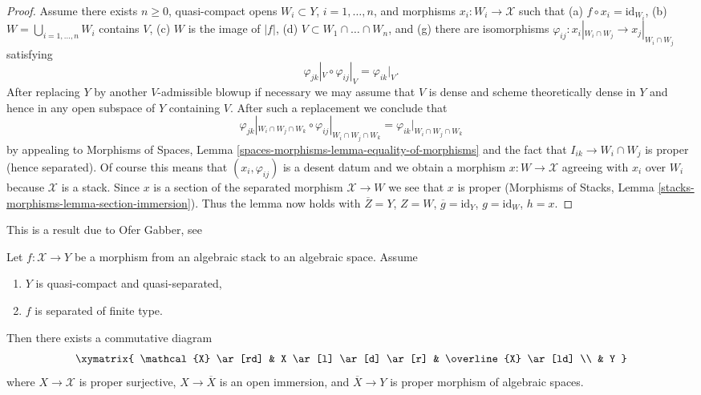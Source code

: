 \begin{proof}
\medskip\noindent
Assume there exists $n \geq 0$, quasi-compact opens
$W_i \subset Y$, $i = 1, \ldots, n$, and
morphisms $x_i : W_i \to \mathcal{X}$ such that
(a) $f \circ x_i = \text{id}_{W_i}$,
(b) $W = \bigcup_{i = 1, \ldots, n} W_i$ contains $V$,
(c) $W$ is the image of $|f|$,
(d) $V \subset W_1 \cap \ldots \cap W_n$, and
(g) there are isomorphisms
$\varphi_{ij} : x_i|_{W_i \cap W_j} \to x_j|_{W_i \cap W_j}$
satisfying
$$
\varphi_{jk}|_V \circ \varphi_{ij}|_V = \varphi_{ik}|_V.
$$
After replacing $Y$ by another $V$-admissible blowup if necessary
we may assume that $V$ is dense and scheme theoretically dense
in $Y$ and hence in any open subspace of $Y$ containing $V$.
After such a replacement we conclude that
$$
\varphi_{jk}|_{W_i \cap W_j \cap W_k} \circ
\varphi_{ij}|_{W_i \cap W_j \cap W_k} =
\varphi_{ik}|_{W_i \cap W_j \cap W_k}
$$
by appealing to Morphisms of Spaces, Lemma
\ref{spaces-morphisms-lemma-equality-of-morphisms}
and the fact that $I_{ik} \to W_i \cap W_j$ is proper
(hence separated).
Of course this means that $(x_i, \varphi_{ij})$
is a desent datum and we obtain a morphism
$x : W \to \mathcal{X}$ agreeing with $x_i$ over $W_i$
because $\mathcal{X}$ is a stack.
Since $x$ is a section of the separated morphism
$\mathcal{X} \to W$ we see that $x$ is proper
(Morphisms of Stacks, Lemma \ref{stacks-morphisms-lemma-section-immersion}).
Thus the lemma now holds with $\overline{Z} = Y$,
$Z = W$, $\overline{g} = \text{id}_Y$, $g = \text{id}_W$,
$h = x$.
\end{proof}

\begin{theorem}
\label{theorem-chow-finite-type}
\begin{reference}
This is a result due to Ofer Gabber, see
\cite[Theorem 1.1]{olsson_proper}
\end{reference}
Let $f : \mathcal{X} \to Y$ be a morphism from an algebraic stack
to an algebraic space. Assume
\begin{enumerate}
\item $Y$ is quasi-compact and quasi-separated,
\item $f$ is separated of finite type.
\end{enumerate}
Then there exists a commutative diagram
$$
\xymatrix{
\mathcal{X} \ar[rd] & X \ar[l] \ar[d] \ar[r] & \overline{X} \ar[ld] \\
& Y
}
$$
where $X \to \mathcal{X}$ is proper surjective,
$X \to \overline{X}$ is an open immersion, and
$\overline{X} \to Y$ is proper morphism of algebraic spaces.
\end{theorem}

